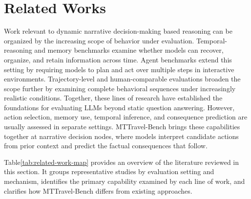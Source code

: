 \documentclass[pdflatex,sn-mathphys-num]{sn-jnl}%
\theoremstyle{thmstyleone}%
\theoremstyle{thmstyletwo}%
\theoremstyle{thmstylethree}%
\begin{document}
\section{Related Works}
Work relevant to dynamic narrative decision-making based reasoning can be organized by the increasing scope of behavior under evaluation. Temporal-reasoning and memory benchmarks examine whether models can recover, organize, and retain information across time. Agent benchmarks extend this setting by requiring models to plan and act over multiple steps in interactive environments. Trajectory-level and human-comparable evaluations broaden the scope further by examining complete behavioral sequences under increasingly realistic conditions. Together, these lines of research have established the foundations for evaluating LLMs beyond static question answering. However, action selection, memory use, temporal inference, and consequence prediction are usually assessed in separate settings. MTTravel-Bench brings these capabilities together at narrative decision nodes, where models interpret candidate actions from prior context and predict the factual consequences that follow.

Table\ref{tab:related-work-map} provides an overview of the literature reviewed in this section. It groups representative studies by evaluation setting and mechanism, identifies the primary capability examined by each line of work, and clarifies how MTTravel-Bench differs from existing approaches.
\end{document}
